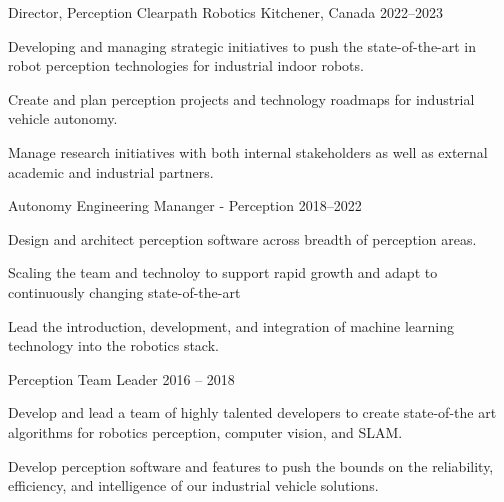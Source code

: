 \documentclass[11pt, a4paper]{awesome-cv}
\begin{document}
\begin{cventries}
\cventry
  {Director, Perception}
  {Clearpath Robotics}
  {Kitchener, Canada}
  {2022--2023}
  {
    \begin{cvitems}
      \item Developing and managing strategic initiatives to push the state-of-the-art in robot perception technologies for industrial indoor robots. 
      \item Create and plan perception projects and technology roadmaps for industrial vehicle autonomy. 
      \item Manage research initiatives with both internal stakeholders as well as external academic and industrial partners. 
    \end{cvitems} 
  }

\vspace*{-2mm}
\cventry
  {Autonomy Engineering Mananger - Perception}
  {}
  {}
  {2018--2022}
  {
    \begin{cvitems}
      \item Design and architect perception software across breadth of perception areas.
      \item Scaling the team and technoloy to support rapid growth and adapt to continuously changing state-of-the-art
      \item Lead the introduction, development, and integration of machine learning technology into the robotics stack.
     \end{cvitems} 
  }

\vspace*{-2mm}
\cventry
  {Perception Team Leader} 
  {}
  {}
  {2016 -- 2018}
  {
    \begin{cvitems}
      \item Develop and lead a team of highly talented developers to create state-of-the art algorithms for robotics perception, computer vision, and SLAM.
      \item Develop perception software and features to push the bounds on the reliability, efficiency, and intelligence of our industrial vehicle solutions.
    \end{cvitems} 
  }


\end{cventries}
\end{document}
